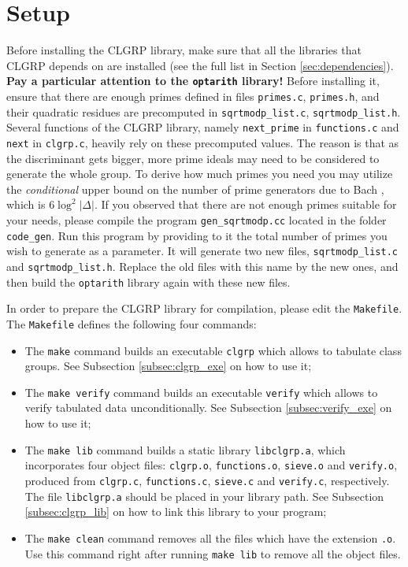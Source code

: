 \documentclass[a4paper,10pt]{article}
\newcommand{\code}{\lstinline}
\begin{document}
\section{Setup} \label{subsec:clgrp_setup}

Before installing the CLGRP library, make sure that all the libraries that CLGRP depends on are installed (see the full list in Section \ref{sec:dependencies}). \textbf{Pay a particular attention to the \code{optarith} library!} Before installing it, ensure that there are enough primes defined in files \code{primes.c}, \code{primes.h}, and their quadratic residues are precomputed in \code{sqrtmodp_list.c}, \code{sqrtmodp_list.h}. Several functions of the CLGRP library, namely \code{next_prime} in \code{functions.c} and \code{next} in \code{clgrp.c}, heavily rely on these precomputed values. The reason is that as the discriminant gets bigger, more prime ideals may need to be considered to generate the whole group. To derive how much primes you need you may utilize the \emph{conditional} upper bound on the number of prime generators due to Bach \cite{bach}, which is $6\log^2|\Delta|$. If you observed that there are not enough primes suitable for your needs, please compile the program \code{gen_sqrtmodp.cc} located in the folder \code{code_gen}. Run this program by providing to it the total number of primes you wish to generate as a parameter. It will generate two new files, \code{sqrtmodp_list.c} and \code{sqrtmodp_list.h}. Replace the old files with this name by the new ones, and then build the \code{optarith} library again with these new files.

In order to prepare the CLGRP library for compilation, please edit the \code{Makefile}. The \code{Makefile} defines the following four commands:

\begin{itemize}

\item The \code{make} command builds an executable \code{clgrp} which allows to tabulate class groups. See Subsection \ref{subsec:clgrp_exe} on how to use it;

\item The \code{make verify} command builds an executable \code{verify} which allows to verify tabulated data unconditionally. See Subsection \ref{subsec:verify_exe} on how to use it;

\item The \code{make lib} command builds a static library \code{libclgrp.a}, which incorporates four object files: \code{clgrp.o}, \code{functions.o}, \code{sieve.o} and \code{verify.o}, produced from \code{clgrp.c}, \code{functions.c}, \code{sieve.c} and \code{verify.c}, respectively. The file \code{libclgrp.a} should be placed in your library path. See Subsection \ref{subsec:clgrp_lib} on how to link this library to your program;

\item The \code{make clean} command removes all the files which have the extension \code{.o}. Use this command right after running \code{make lib} to remove all the object files.
\end{itemize}
\end{document}
